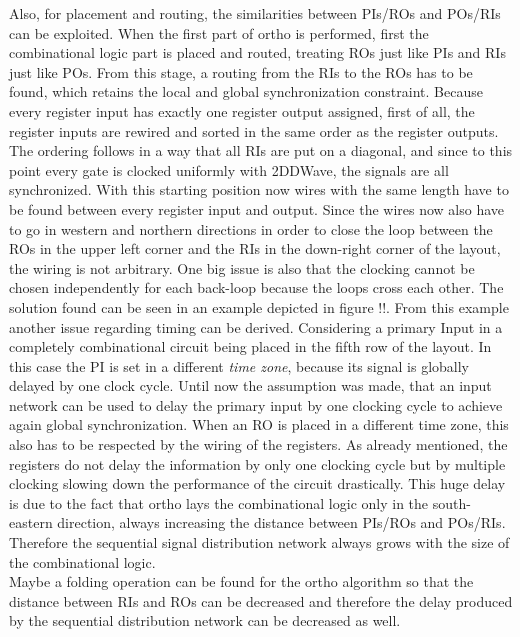 Also, for placement and routing, the similarities between PIs/ROs and POs/RIs can be exploited. When the first part of ortho is performed, first the combinational logic part is placed and routed, treating ROs just like PIs and RIs just like POs. From this stage, a routing from the RIs to the ROs has to be found, which retains the local and global synchronization constraint. Because every register input has exactly one register output assigned, first of all, the register inputs are rewired and sorted in the same order as the register outputs. The ordering follows in a way that all RIs are put on a diagonal, and since to this point every gate is clocked uniformly with 2DDWave, the signals are all synchronized. With this starting position now wires with the same length have to be found between every register input and output. Since the wires now also have to go in western and northern directions in order to close the loop between the ROs in the upper left corner and the RIs in the down-right corner of the layout, the wiring is not arbitrary. One big issue is also that the clocking cannot be chosen independently for each back-loop because the loops cross each other. The solution found can be seen in an example depicted in figure !!. From this example another issue regarding timing can be derived. Considering a primary Input in a completely combinational circuit being placed in the fifth row of the layout. In this case the PI is set in a different \textit{time zone}, because its signal is globally delayed by one clock cycle. Until now the assumption was made, that an input network can be used to delay the primary input by one clocking cycle to achieve again global synchronization. When an RO is placed in a different time zone, this also has to be respected by the wiring of the registers. As already mentioned, the registers do not delay the information by only one clocking cycle but by multiple clocking slowing down the performance of the circuit drastically. This huge delay is due to the fact that ortho lays the combinational logic only in the south-eastern direction, always increasing the distance between PIs/ROs and POs/RIs. Therefore the sequential signal distribution network always grows with the size of the combinational logic.\\
Maybe a folding operation can be found for the ortho algorithm so that the distance between RIs and ROs can be decreased and therefore the delay produced by the sequential distribution network can be decreased as well.


